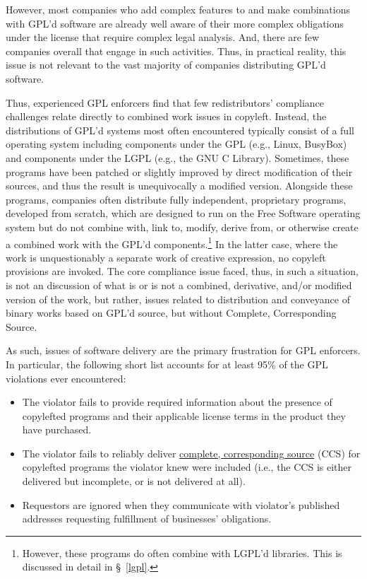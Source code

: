 However, most companies who add
complex features to and make combinations with GPL'd software
are already well aware of their
more complex obligations under the license that require complex legal
analysis.  And, there are few companies overall that engage in such
activities. Thus,  in practical reality, this issue is not relevant to the vast
majority of companies distributing GPL'd software.

Thus, experienced  GPL enforcers find that few redistributors'
compliance challenges relate directly to combined work issues in copyleft.
Instead, the distributions of GPL'd
systems most often encountered typically consist of a full operating system
including components under the GPL (e.g., Linux, BusyBox) and components
under the LGPL (e.g., the GNU C Library).  Sometimes, these programs have
been patched or slightly improved by direct modification of their sources,
and thus the result is unequivocally a modified version.  Alongside these programs,
companies often distribute fully independent, proprietary programs,
developed from scratch, which are designed to run on the Free Software operating
system but do not combine with, link to, modify, derive from, or otherwise
create a combined work with
the GPL'd components.\footnote{However, these programs do often combine
  with LGPL'd libraries. This is discussed in detail in \S~\ref{lgpl}.}
In the latter case, where the work is unquestionably a separate work of
creative expression, no copyleft provisions are invoked.
The core compliance issue faced, thus, in such a situation, is not an discussion of what is or is not a
combined, derivative, and/or modified version of the work, but rather, issues related to distribution and
conveyance of binary works based on GPL'd source, but without Complete,
Corresponding Source.

As such, issues of software delivery are the primary frustration for GPL
enforcers. In particular, the following short list accounts for at least 95\%
of the GPL violations ever encountered:

\begin{itemize}

\item The violator fails to provide required information about the presence
  of copylefted programs and their applicable license terms in the product
  they have purchased.

\item The violator fails to reliably deliver \hyperref[CCS
  Definition]{complete, corresponding source} (CCS) for copylefted programs
  the violator knew were included (i.e., the CCS is either delivered but
  incomplete, or is not delivered at all).

\item Requestors are ignored when they communicate with violator's published
  addresses requesting fulfillment of businesses' obligations.
\end{itemize}


